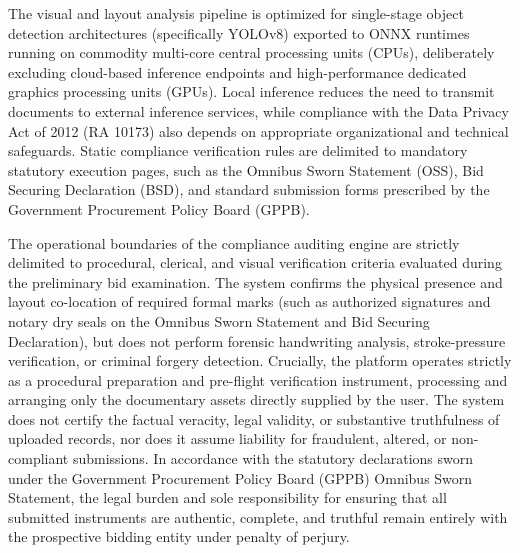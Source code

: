 The visual and layout analysis pipeline is optimized for single-stage object detection architectures (specifically YOLOv8) exported to ONNX runtimes running on commodity multi-core central processing units (CPUs), deliberately excluding cloud-based inference endpoints and high-performance dedicated graphics processing units (GPUs). Local inference reduces the need to transmit documents to external inference services, while compliance with the Data Privacy Act of 2012 (RA 10173) also depends on appropriate organizational and technical safeguards.
Static compliance verification rules are delimited to mandatory statutory execution pages, such as the Omnibus Sworn Statement (OSS), Bid Securing Declaration (BSD), and standard submission forms prescribed by the Government Procurement Policy Board (GPPB).

The operational boundaries of the compliance auditing engine are strictly delimited to procedural, clerical, and visual verification criteria evaluated during the preliminary bid examination.
The system confirms the physical presence and layout co-location of required formal marks (such as authorized signatures and notary dry seals on the Omnibus Sworn Statement and Bid Securing Declaration), but does not perform forensic handwriting analysis, stroke-pressure verification, or criminal forgery detection.
Crucially, the platform operates strictly as a procedural preparation and pre-flight verification instrument, processing and arranging only the documentary assets directly supplied by the user.
The system does not certify the factual veracity, legal validity, or substantive truthfulness of uploaded records, nor does it assume liability for fraudulent, altered, or non-compliant submissions.
In accordance with the statutory declarations sworn under the Government Procurement Policy Board (GPPB) Omnibus Sworn Statement, the legal burden and sole responsibility for ensuring that all submitted instruments are authentic, complete, and truthful remain entirely with the prospective bidding entity under penalty of perjury.

